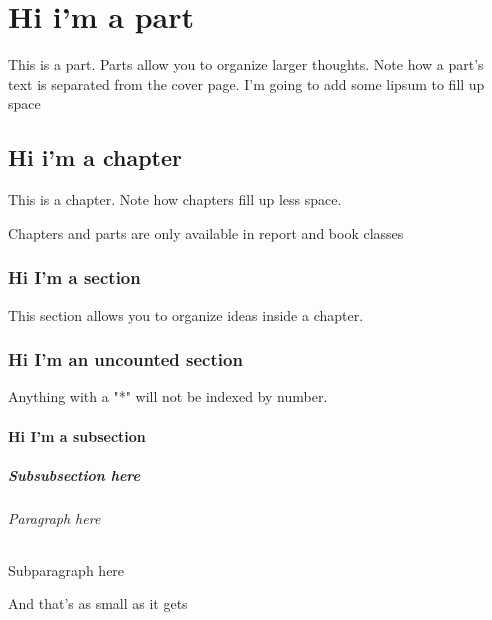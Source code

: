 \documentclass[12pt]{report}
\begin{document}
\tableofcontents %

\part{Hi i'm a part}
This is a part. Parts allow you to organize larger thoughts. Note how a part's text is separated from the cover page. I'm going to add some lipsum to fill up space 

\lipsum[1]

\chapter{Hi i'm a chapter}
This is a chapter. Note how chapters fill up less space. 

Chapters and parts are only available in report and book classes 

\lipsum[1]

\section{Hi I'm a section}
This section allows you to organize ideas inside a chapter.


\section*{Hi I'm an uncounted section}
Anything with a "*" will not be indexed by number. 

\lipsum[1]

\subsection{Hi I'm a subsection}
\lipsum[1]

\subsubsection{Subsubsection here}
\lipsum[1]

\paragraph{Paragraph here}
\lipsum[1]


\subparagraph{Subparagraph here}
\lipsum[1]

And that's as small as it gets 
\end{document}
